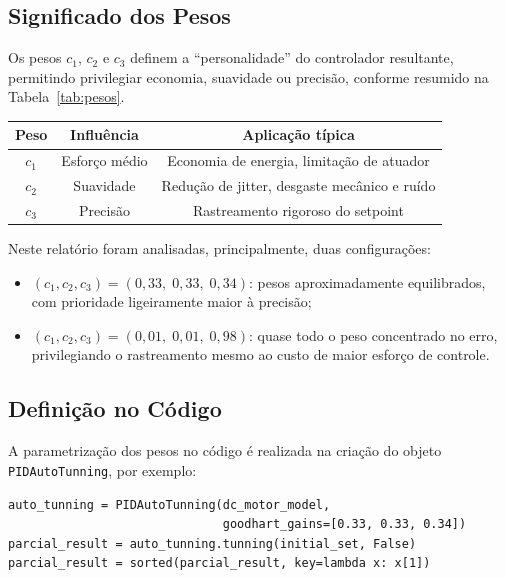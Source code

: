 \documentclass[12pt,a4paper]{article}
\begin{document}
\subsection{Significado dos Pesos}

Os pesos $c_1$, $c_2$ e $c_3$ definem a ``personalidade'' do controlador resultante, permitindo privilegiar economia, suavidade ou precisão, conforme resumido na Tabela~\ref{tab:pesos}.

\begin{center}
\begin{tabular}{|c|c|c|}
\hline
\textbf{Peso} & \textbf{Influência} & \textbf{Aplicação típica} \\
\hline
$c_1$ & Esforço médio & Economia de energia, limitação de atuador \\
$c_2$ & Suavidade     & Redução de jitter, desgaste mecânico e ruído \\
$c_3$ & Precisão      & Rastreamento rigoroso do setpoint \\
\hline
\end{tabular}
\label{tab:pesos}
\end{center}

Neste relatório foram analisadas, principalmente, duas configurações:
\begin{itemize}
    \item $(c_1, c_2, c_3) = (0{,}33,\;0{,}33,\;0{,}34)$: pesos aproximadamente equilibrados, com prioridade ligeiramente maior à precisão;
    \item $(c_1, c_2, c_3) = (0{,}01,\;0{,}01,\;0{,}98)$: quase todo o peso concentrado no erro, privilegiando o rastreamento mesmo ao custo de maior esforço de controle.
\end{itemize}

\subsection{Definição no Código}

A parametrização dos pesos no código é realizada na criação do objeto \texttt{PIDAutoTunning}, por exemplo:
\begin{verbatim}
auto_tunning = PIDAutoTunning(dc_motor_model,
                              goodhart_gains=[0.33, 0.33, 0.34])
parcial_result = auto_tunning.tunning(initial_set, False)
parcial_result = sorted(parcial_result, key=lambda x: x[1])
\end{verbatim}
\end{document}
